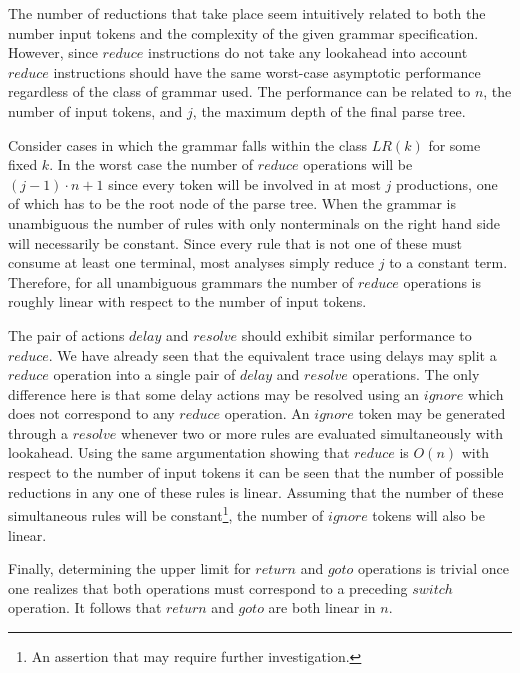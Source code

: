 \documentclass[a4paper,11pt]{article}
\begin{document}
The number of reductions that take place seem intuitively related to both the number input tokens and the complexity of the given grammar specification.
However, since $reduce$ instructions do not take any lookahead into account $reduce$ instructions should have the same worst-case asymptotic performance regardless of the class of grammar used.
The performance can be related to $n$, the number of input tokens, and $j$, the maximum depth of the final parse tree.

Consider cases in which the grammar falls within the class $LR(k)$ for some fixed $k$.
In the worst case the number of $reduce$ operations will be $(j - 1) \cdot n + 1$ since every token will be involved in at most $j$ productions, one of which has to be the root node of the parse tree.
When the grammar is unambiguous the number of rules with only nonterminals on the right hand side will necessarily be constant.
Since every rule that is not one of these must consume at least one terminal, most analyses simply reduce $j$ to a constant term.
Therefore, for all unambiguous grammars the number of $reduce$ operations is roughly linear with respect to the number of input tokens.


The pair of actions $delay$ and $resolve$ should exhibit similar performance to $reduce$.
We have already seen that the equivalent trace using delays may split a $reduce$ operation into a single pair of $delay$ and $resolve$ operations.
The only difference here is that some delay actions may be resolved using an $ignore$ which does not correspond to any $reduce$ operation.
An $ignore$ token may be generated through a $resolve$ whenever two or more rules are evaluated simultaneously with lookahead. 
Using the same argumentation showing that $reduce$ is $O(n)$ with respect to the number of input tokens it can be seen that the number of possible reductions in any one of these rules is linear.
Assuming that the number of these simultaneous rules will be constant\footnote{An assertion that may require further investigation.}, the number of $ignore$ tokens will also be linear.

Finally, determining the upper limit for $return$ and $goto$ operations is trivial once one realizes that both operations must correspond to a preceding $switch$ operation. 
It follows that $return$ and $goto$ are both linear in $n$.\\
\end{document}
